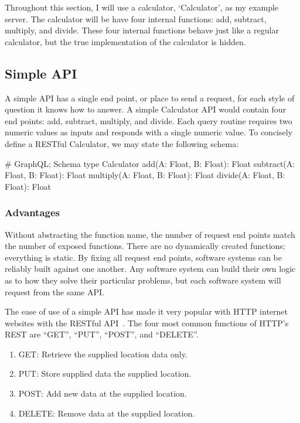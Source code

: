 \documentclass[stat,dissertation]{puthesis}\usepackage[]{graphicx}\usepackage{xcolor}
\begin{document}
Throughout this section, I will use a calculator, `Calculator', as my example server.  The calculator will be have four internal functions: add, subtract, multiply, and divide.  These four internal functions behave just like a regular calculator, but the true implementation of the calculator is hidden.

\subsection{Simple API}

A simple API has a single end point, or place to send a request, for each style of question it knows how to answer.  A simple Calculator API would contain four end points: add, subtract, multiply, and divide.  Each query routine requires two numeric values as inputs and responds with a single numeric value.  To concisely define a RESTful Calculator, we may state the following schema:

\begin{graphqlcode}
# GraphQL; Schema
type Calculator {
  add(A: Float, B: Float): Float
  subtract(A: Float, B: Float): Float
  multiply(A: Float, B: Float): Float
  divide(A: Float, B: Float): Float
}
\end{graphqlcode}

\subsubsection{Advantages}

Without abstracting the function name, the number of request end points match the number of exposed functions.  There are no dynamically created functions; everything is static.  By fixing all request end points, software systems can be reliably built against one another.  Any software system can build their own logic as to how they solve their particular problems, but each software system will request from the same API.

The ease of use of a simple API has made it very popular with HTTP internet websites with the RESTful API~\cite{rest_popular}.  The four most common functions of HTTP's REST are ``GET'', ``PUT'', ``POST'', and ``DELETE''.

\begin{enumerate}
  \item GET: Retrieve the supplied location data only.
  \item PUT: Store supplied data the supplied location.
  \item POST: Add new data at the supplied location.
  \item DELETE: Remove data at the supplied location.
\end{enumerate}
\end{document}
